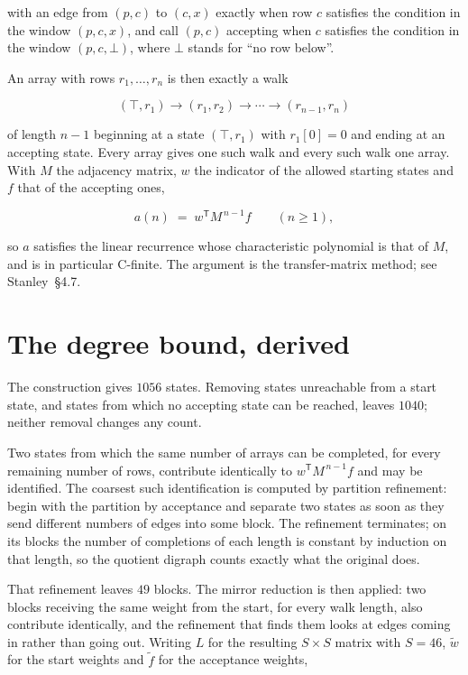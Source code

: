 \documentclass[11pt]{article}
\theoremstyle{definition}
\begin{document}
with an edge from $(p,c)$ to $(c,x)$ exactly when row $c$ satisfies the condition in the window $(p,c,x)$, and call $(p,c)$ accepting when $c$ satisfies the condition in the window $(p,c,\bot)$, where $\bot$ stands for ``no row below''.

An array with rows $r_1,\dots,r_n$ is then exactly a walk

\[(\top,r_1) \to (r_1,r_2) \to \cdots \to (r_{n-1},r_n)\]

of length $n-1$ beginning at a state $(\top,r_1)$ with $r_1[0]=0$ and ending at an accepting state. Every array gives one such walk and every such walk one array. With $M$ the adjacency matrix, $w$ the indicator of the allowed starting states and $f$ that of the accepting ones,

\[a(n) \;=\; w^{\mathsf T} M^{\,n-1} f \qquad (n \ge 1),\]

so $a$ satisfies the linear recurrence whose characteristic polynomial is that of $M$, and is in particular C-finite. The argument is the transfer-matrix method; see Stanley~\S4.7.

\section{The degree bound, derived}

The construction gives $1056$ states. Removing states unreachable from a start state, and states from which no accepting state can be reached, leaves $1040$; neither removal changes any count.

Two states from which the same number of arrays can be completed, for every remaining number of rows, contribute identically to $w^{\mathsf T}M^{\,n-1}f$ and may be identified. The coarsest such identification is computed by partition refinement: begin with the partition by acceptance and separate two states as soon as they send different numbers of edges into some block. The refinement terminates; on its blocks the number of completions of each length is constant by induction on that length, so the quotient digraph counts exactly what the original does.

That refinement leaves $49$ blocks. The mirror reduction is then applied: two blocks receiving the same weight from the start, for every walk length, also contribute identically, and the refinement that finds them looks at edges coming in rather than going out. Writing $L$ for the resulting $S \times S$ matrix with $S = 46$, $\tilde w$ for the start weights and $\tilde f$ for the acceptance weights,
\end{document}
